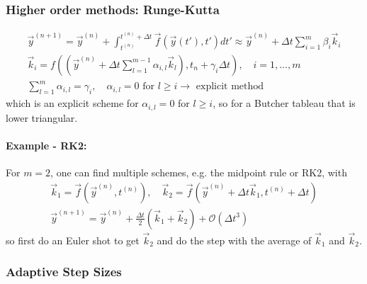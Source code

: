 \subsubsection*{Higher order methods: Runge-Kutta}
\begin{equation}
    \begin{gathered}
    \vec{y}^{(n+1)}= \vec{y}^{(n)} + \int_{t^{(n)}}^{t^{(n)} + \Delta t} \vec{f}(\vec{y}(t'),t') dt' \approx \vec{y}^{(n)}+\Delta t \sum_{i=1}^m \beta_i \vec{k}_i \\
    \vec{k}_i=f\left(\left(\vec{y}^{(n)}+\Delta t \sum_{l=1}^{m-1} \alpha_{i, l} \vec{k}_l\right), t_n+\gamma_i \Delta t\right), \quad i=1, \ldots, m \\
    \sum_{l=1}^m \alpha_{i, l}=\gamma_i, \quad \alpha_{i, l}=0 \text { for } l \geq i \rightarrow \text { explicit method }
    \end{gathered}
\end{equation}
which is an explicit scheme for $\alpha_{i, l} = 0$ for $l \geq i$, so for a Butcher tableau that is lower triangular.
\paragraph{Example - RK2:} For $m = 2$, one can find multiple schemes, e.g. the midpoint rule or RK2, with
\begin{equation}
    \begin{gathered}
        \vec{k}_1 = \vec{f}(\vec{y}^{(n)}, t^{(n)}), \quad \vec{k}_2 = \vec{f}(\vec{y}^{(n)} + \Delta t \vec{k}_1, t^{(n)} + \Delta t) \\
        \vec{y}^{(n+1)} = \vec{y}^{(n)} + \frac{\Delta t}{2} \left( \vec{k}_1 + \vec{k}_2 \right) + \mathcal{O}(\Delta t^3)
    \end{gathered}
\end{equation}
so first do an Euler shot to get $\vec{k}_2$ and do the step with the average of $\vec{k}_1$ and $\vec{k}_2$.

\subsubsection*{Adaptive Step Sizes}

